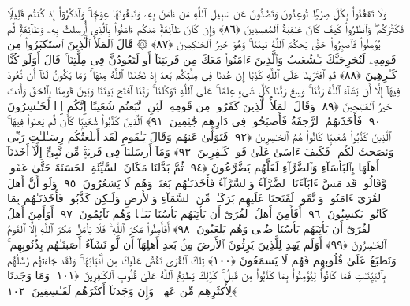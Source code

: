 وَلَا تَقعُدُوا۟ بِكُلِّ صِرَٰطٍۢ تُوعِدُونَ وَتَصُدُّونَ عَن سَبِيلِ ٱللَّهِ مَن ءَامَنَ بِهِۦ وَتَبغُونَهَا عِوَجًۭا ۚ وَٱذكُرُوٓا۟ إِذ كُنتُم قَلِيلًۭا فَكَثَّرَكُم ۖ وَٱنظُرُوا۟ كَيفَ كَانَ عَـٰقِبَةُ ٱلمُفسِدِينَ ﴿٨٦﴾
 وَإِن كَانَ طَآئِفَةٌۭ مِّنكُم ءَامَنُوا۟ بِٱلَّذِىٓ أُرسِلتُ بِهِۦ وَطَآئِفَةٌۭ لَّم يُؤمِنُوا۟ فَٱصبِرُوا۟ حَتَّىٰ يَحكُمَ ٱللَّهُ بَينَنَا ۚ وَهُوَ خَيرُ ٱلحَـٰكِمِينَ ﴿٨٧﴾
 ۞ قَالَ ٱلمَلَأُ ٱلَّذِينَ ٱستَكبَرُوا۟ مِن قَومِهِۦ لَنُخرِجَنَّكَ يَـٰشُعَيبُ وَٱلَّذِينَ ءَامَنُوا۟ مَعَكَ مِن قَريَتِنَآ أَو لَتَعُودُنَّ فِى مِلَّتِنَا ۚ قَالَ أَوَلَو كُنَّا كَـٰرِهِينَ ﴿٨٨﴾
 قَدِ ٱفتَرَينَا عَلَى ٱللَّهِ كَذِبًا إِن عُدنَا فِى مِلَّتِكُم بَعدَ إِذ نَجَّىٰنَا ٱللَّهُ مِنهَا ۚ وَمَا يَكُونُ لَنَآ أَن نَّعُودَ فِيهَآ إِلَّآ أَن يَشَآءَ ٱللَّهُ رَبُّنَا ۚ وَسِعَ رَبُّنَا كُلَّ شَىءٍ عِلمًا ۚ عَلَى ٱللَّهِ تَوَكَّلنَا ۚ رَبَّنَا ٱفتَح بَينَنَا وَبَينَ قَومِنَا بِٱلحَقِّ وَأَنتَ خَيرُ ٱلفَـٰتِحِينَ ﴿٨٩﴾
 وَقَالَ ٱلمَلَأُ ٱلَّذِينَ كَفَرُوا۟ مِن قَومِهِۦ لَئِنِ ٱتَّبَعتُم شُعَيبًا إِنَّكُم إِذًۭا لَّخَـٰسِرُونَ ﴿٩٠﴾
 فَأَخَذَتهُمُ ٱلرَّجفَةُ فَأَصبَحُوا۟ فِى دَارِهِم جَٰثِمِينَ ﴿٩١﴾
 ٱلَّذِينَ كَذَّبُوا۟ شُعَيبًۭا كَأَن لَّم يَغنَوا۟ فِيهَا ۚ ٱلَّذِينَ كَذَّبُوا۟ شُعَيبًۭا كَانُوا۟ هُمُ ٱلخَـٰسِرِينَ ﴿٩٢﴾
 فَتَوَلَّىٰ عَنهُم وَقَالَ يَـٰقَومِ لَقَد أَبلَغتُكُم رِسَـٰلَـٰتِ رَبِّى وَنَصَحتُ لَكُم ۖ فَكَيفَ ءَاسَىٰ عَلَىٰ قَومٍۢ كَـٰفِرِينَ ﴿٩٣﴾
 وَمَآ أَرسَلنَا فِى قَريَةٍۢ مِّن نَّبِىٍّ إِلَّآ أَخَذنَآ أَهلَهَا بِٱلبَأسَآءِ وَٱلضَّرَّآءِ لَعَلَّهُم يَضَّرَّعُونَ ﴿٩٤﴾
 ثُمَّ بَدَّلنَا مَكَانَ ٱلسَّيِّئَةِ ٱلحَسَنَةَ حَتَّىٰ عَفَوا۟ وَّقَالُوا۟ قَد مَسَّ ءَابَآءَنَا ٱلضَّرَّآءُ وَٱلسَّرَّآءُ فَأَخَذنَـٰهُم بَغتَةًۭ وَهُم لَا يَشعُرُونَ ﴿٩٥﴾
 وَلَو أَنَّ أَهلَ ٱلقُرَىٰٓ ءَامَنُوا۟ وَٱتَّقَوا۟ لَفَتَحنَا عَلَيهِم بَرَكَـٰتٍۢ مِّنَ ٱلسَّمَآءِ وَٱلأَرضِ وَلَـٰكِن كَذَّبُوا۟ فَأَخَذنَـٰهُم بِمَا كَانُوا۟ يَكسِبُونَ ﴿٩٦﴾
 أَفَأَمِنَ أَهلُ ٱلقُرَىٰٓ أَن يَأتِيَهُم بَأسُنَا بَيَـٰتًۭا وَهُم نَآئِمُونَ ﴿٩٧﴾
 أَوَأَمِنَ أَهلُ ٱلقُرَىٰٓ أَن يَأتِيَهُم بَأسُنَا ضُحًۭى وَهُم يَلعَبُونَ ﴿٩٨﴾
 أَفَأَمِنُوا۟ مَكرَ ٱللَّهِ ۚ فَلَا يَأمَنُ مَكرَ ٱللَّهِ إِلَّا ٱلقَومُ ٱلخَـٰسِرُونَ ﴿٩٩﴾
 أَوَلَم يَهدِ لِلَّذِينَ يَرِثُونَ ٱلأَرضَ مِنۢ بَعدِ أَهلِهَآ أَن لَّو نَشَآءُ أَصَبنَـٰهُم بِذُنُوبِهِم ۚ وَنَطبَعُ عَلَىٰ قُلُوبِهِم فَهُم لَا يَسمَعُونَ ﴿١٠٠﴾
 تِلكَ ٱلقُرَىٰ نَقُصُّ عَلَيكَ مِن أَنۢبَآئِهَا ۚ وَلَقَد جَآءَتهُم رُسُلُهُم بِٱلبَيِّنَـٰتِ فَمَا كَانُوا۟ لِيُؤمِنُوا۟ بِمَا كَذَّبُوا۟ مِن قَبلُ ۚ كَذَٟلِكَ يَطبَعُ ٱللَّهُ عَلَىٰ قُلُوبِ ٱلكَـٰفِرِينَ ﴿١٠١﴾
 وَمَا وَجَدنَا لِأَكثَرِهِم مِّن عَهدٍۢ ۖ وَإِن وَجَدنَآ أَكثَرَهُم لَفَـٰسِقِينَ ﴿١٠٢﴾
